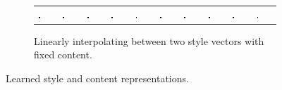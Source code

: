 \begin{figure}
	\begin{subfigure}[t]{\textwidth}
	\begin{tabu} to \textwidth {XXXXXXXXXX}
		\includegraphics[width=0.09\textwidth]{tensors/sandc/interp/output10} &
		\includegraphics[width=0.09\textwidth]{tensors/sandc/interp/output11} &
		\includegraphics[width=0.09\textwidth]{tensors/sandc/interp/output12} &
		\includegraphics[width=0.09\textwidth]{tensors/sandc/interp/output13} &
		\includegraphics[width=0.09\textwidth]{tensors/sandc/interp/output14} &
		\includegraphics[width=0.09\textwidth]{tensors/sandc/interp/output15} &
		\includegraphics[width=0.09\textwidth]{tensors/sandc/interp/output16} &
		\includegraphics[width=0.09\textwidth]{tensors/sandc/interp/output17} &
		\includegraphics[width=0.09\textwidth]{tensors/sandc/interp/output18} &
		\includegraphics[width=0.09\textwidth]{tensors/sandc/interp/output19}
	\end{tabu}
	\caption{Linearly interpolating between two style vectors with fixed content.}
	\end{subfigure}
	\caption{Learned style and content representations.}
	\label{fig:sandc-interp}
\end{figure}

